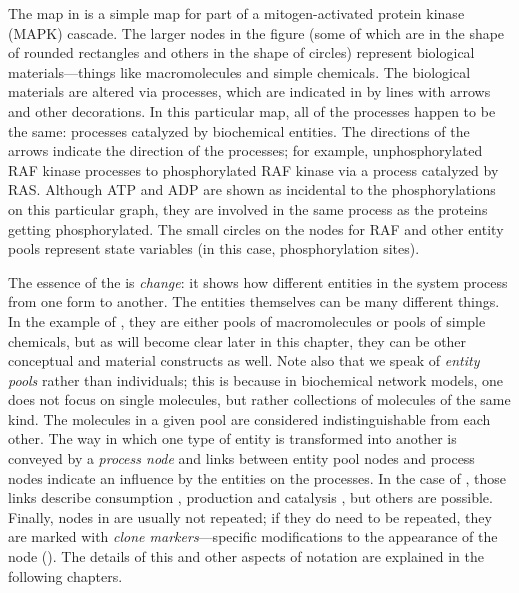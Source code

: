 The map in  is a simple map for part of a mitogen-activated protein kinase (MAPK) cascade.  The larger nodes in the figure (some of which are in the shape of rounded rectangles and others in the shape of circles) represent biological materials---things like macromolecules and simple chemicals.  The biological materials are altered via processes, which are indicated in \PDl by lines with arrows and other decorations.  In this particular map, all of the processes happen to be the same: processes catalyzed by biochemical entities.  The directions of the arrows indicate the direction of the processes; for example, unphosphorylated RAF kinase processes to phosphorylated RAF kinase via a process catalyzed by RAS. Although ATP and ADP are shown as incidental to the phosphorylations on this particular graph, they are involved in the same process as the proteins getting phosphorylated. The small circles on the nodes for RAF and other entity pools represent state variables (in this case, phosphorylation sites). 

The essence of the \PDs is \emph{change}: it shows how different entities in the system process from one form to another.  The entities themselves can be many different things.  In the example of , they are either pools of macromolecules or pools of simple chemicals, but as will become clear later in this chapter, they can be other conceptual and material constructs as well.  Note also that we speak of \emph{entity pools} rather than individuals; this is because in biochemical network models, one does not focus on single molecules, but rather collections of molecules of the same kind.  The molecules in a given pool are considered indistinguishable from each other.  The way in which one type of entity is transformed into another is conveyed by a \emph{process node} and links between entity pool nodes and process nodes indicate an influence by the entities on the processes.  In the case of , those links describe consumption , production  and catalysis , but others are possible.  Finally, nodes in \PDs are usually not repeated; if they do need to be repeated, they are marked with \emph{clone markers}---specific modifications to the appearance of the node (). The details of this and other aspects of \PD notation are explained in the following chapters.


